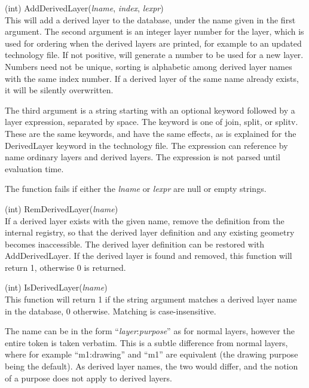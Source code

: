 \begin{description}
\item{(int) \vt AddDerivedLayer({\it lname\/}, {\it index\/},
 {\it lexpr\/})}\\
This will add a derived layer to the database, under the name given in
the first argument.  The second argument is an integer layer number
for the layer, which is used for ordering when the derived layers are
printed, for example to an updated technology file.  If not positive,
{\Xic} will generate a number to be used for a new layer.  Numbers
need not be unique, sorting is alphabetic among derived layer names
with the same index number.  If a derived layer of the same name
already exists, it will be silently overwritten.

The third argument is a string starting with an optional keyword
followed by a layer expression, separated by space.  The keyword is
one of {\vt join}, {\vt split}, or {\vt splitv}.  These are the same
keywords, and have the same effects, as is explained for the {\et
DerivedLayer} keyword in the technology file.  The expression can
reference by name ordinary layers and derived layers.  The expression
is not parsed until evaluation time.

The function fails if either the {\it lname} or {\it lexpr} are null
or empty strings.

\item{(int) \vt RemDerivedLayer({\it lname\/})}\\
If a derived layer exists with the given name, remove the definition
from the internal registry, so that the derived layer definition and
any existing geometry becomes inaccessible.  The derived layer
definition can be restored with {\vt AddDerivedLayer}.  If the derived
layer is found and removed, this function will return 1, otherwise 0
is returned.

\item{(int) \vt IsDerivedLayer({\it lname\/})}\\
This function will return 1 if the string argument matches a derived
layer name in the database, 0 otherwise.  Matching is
case-insensitive.

The name can be in the form ``{\it layer\/}{\vt :}{\it purpose\/}'' as
for normal {\Xic} layers, however the entire token is taken verbatim. 
This is a subtle difference from normal layers, where for example
``{\vt m1:drawing}'' and ``{\vt m1}'' are equivalent (the {\vt
drawing} purpose being the default).  As derived layer names, the two
would differ, and the notion of a purpose does not apply to derived
layers.


\end{description}
